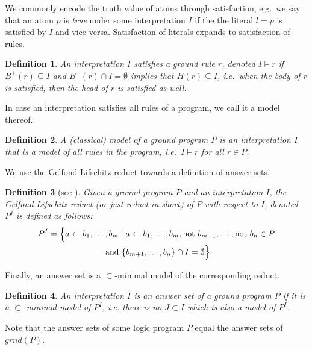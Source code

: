 \documentclass{vutinfth} %
\newtheorem{definition}{Definition}[chapter]
\newcommand{\headf}{H}
\newcommand{\bodyf}{B}
\newcommand{\fail}{\mathrm{not } \ \xspace}
\newcommand{\from}{\ensuremath{\leftarrow}}
\begin{document}
We commonly encode the truth value of atoms through satisfaction, e.g.~we say that an atom $p$ is \emph{true} under some interpretation $I$ if the the literal $l = p$ is satisfied by $I$ and vice versa. Satisfaction of literals expands to satisfaction of rules.%

\begin{definition}
\label{def:rule-model}
An interpretation $I$ \emph{satisfies} a ground rule $r$, denoted $I \models r$ if $\bodyf^+(r) \subseteq I$ and $\bodyf^-(r) \cap I = \emptyset$ implies that $\headf(r) \subseteq I$, i.e.~when the body of $r$ is satisfied, then the head of $r$ is satisfied as well.
\end{definition}

In case an interpretation satisfies all rules of a program, we call it a model thereof.

\begin{definition}
A \emph{(classical) model} of a ground program $P$ is an interpretation $I$ that is a model of all rules in the program, i.e.~$I \models r$ for all $r \in P$.
\end{definition}

We use the Gelfond-Lifschitz reduct towards a definition of answer sets.

\begin{definition}[see {\cite[Section 2]{stable}}]
	Given a ground program $P$ and an interpretation $I$, the \emph{Gelfond-Lifschitz reduct} (or just \emph{reduct} in short) of $P$ with respect to $I$, denoted $P^I$ is defined as follows:
\begin{multline*}
P^I = \Bigl\{ a \from b_1, \ldots , b_m \mid a \from b_1, \ldots, b_m, \fail b_{m+1}, \ldots, \fail b_n \in P\\ \text{ and } \{ b_{m+1} , \ldots , b_n \} \cap I = \emptyset \Bigr\}
\end{multline*}
\end{definition}

Finally, an answer set is a $\subset$-minimal model of the corresponding reduct.

\begin{definition}
An interpretation $I$ is an \emph{answer set} of a ground program $P$ if it is a $\subset$-minimal model of $P^I$, i.e. there is no $J \subset I$ which is also a model of $P^I$.
\end{definition}

Note that the answer sets of some logic program $P$ equal the answer sets of $grnd(P)$.
\end{document}

